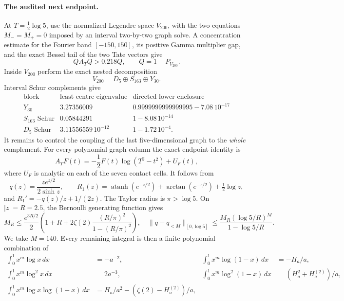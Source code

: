 \documentclass[11pt]{amsart}
\theoremstyle{definition}
\theoremstyle{remark}
\begin{document}
\paragraph{The audited next endpoint.}
At \(T=\frac12\log5\), use the normalized Legendre space \(V_{200}\), with
the two equations \(M_-=M_+=0\) imposed by an interval two-by-two graph
solve.  A concentration estimate for the Fourier band \([-150,150]\), its
positive Gamma multiplier gap, and the exact Bessel tail of the two Tate
vectors give
\begin{equation}\label{eq:logfivecomplement}
 QA_TQ>0.218Q,\qquad Q=1-P_{V_{200}}.
\end{equation}
Inside \(V_{200}\) perform the exact nested decomposition
\[
 V_{200}=D_5\oplus S_{163}\oplus Y_{30}.
\]
Interval Schur complements give
\[
\begin{array}{c|c|c}
\text{block}&\text{least centre eigenvalue}&
              \text{directed lower enclosure}\\ \hline
Y_{30}&3.27356009&0.9999999999999995-7.08\,10^{-17}\\
S_{163}\text{ Schur}&0.05844291&1-8.08\,10^{-14}\\
D_5\text{ Schur}&3.11556559\,10^{-12}&1-1.72\,10^{-4}.
\end{array}
\]
It remains to control the coupling of the last five-dimensional graph to
the \emph{whole} complement.  For every polynomial graph column the exact
endpoint identity is
\begin{equation}\label{eq:endpointlogidentity}
 A_TF(t)=-\frac12F(t)\log(T^2-t^2)+U_F(t),
\end{equation}
where \(U_F\) is analytic on each of the seven contact cells.  It follows
from
\[
 q(z)=\frac{ze^{z/2}}{2\sinh z},\qquad
 R_1(z)=\operatorname{atanh}(e^{-z/2})+
        \arctan(e^{-z/2})+\tfrac12\log z,
\]
and \(R_1'=-q(z)/z+1/(2z)\).  The Taylor radius is \(\pi>\log5\).
On \(|z|=R=2.5\), the Bernoulli generating function gives
\[
 M_R\le \frac{e^{3R/2}}2
 \left(1+R+2\zeta(2)\frac{(R/\pi)^2}{1-(R/\pi)^2}\right),
\quad
 \|q-q_{<M}\|_{[0,\log5]}
 \le \frac{M_R(\log5/R)^M}{1-\log5/R}.
\]
We take \(M=140\).  Every remaining integral is then a finite polynomial
combination of
\[
\begin{aligned}
 \int_0^1x^m\log x\,dx&=-a^{-2},&
 \int_0^1x^m\log(1-x)\,dx&=-H_a/a,\\
 \int_0^1x^m\log^2x\,dx&=2a^{-3},&
 \int_0^1x^m\log^2(1-x)\,dx&=(H_a^2+H_a^{(2)})/a,\\
 \int_0^1x^m\log x\log(1-x)\,dx
 &=H_a/a^2-(\zeta(2)-H_a^{(2)})/a,
\end{aligned}
\]
\end{document}
